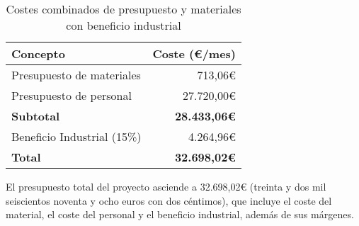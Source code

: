 \begin{table}[H]
	\centering
	\small
	\begin{tabular}{|l|r|}
	\hline
	\textbf{Concepto} & \textbf{Coste (€/mes)} \\
	\hline
	Presupuesto de materiales & 713,06€ \\
	\hline
	Presupuesto de personal & 27.720,00€ \\
	\hline
	\textbf{Subtotal} & \textbf{28.433,06€} \\
	\hline
	\hline
	Beneficio Industrial (15\%) & 4.264,96€ \\
	\hline
	\textbf{Total} & \textbf{32.698,02€} \\
	\hline
	\end{tabular}
	\caption{Costes combinados de presupuesto y materiales con beneficio industrial}
	\label{tab:costes_combinados}
\end{table}

El presupuesto total del proyecto asciende a 32.698,02€ (treinta y dos mil
seiscientos noventa y ocho euros con dos céntimos), que incluye el coste del
material, el coste del personal y el beneficio industrial, además de sus
márgenes.
